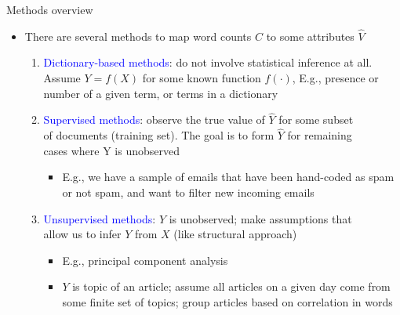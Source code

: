 \documentclass[english]{beamer}
\begin{document}
\begin{frame}{Methods overview}
\begin{itemize}
\setlength{\itemsep}{1em}
\item There are several methods to  map word counts $C$ to some attributes $\hat{V}$
\vspace{7pt}

\pause

\begin{enumerate}
\setlength{\itemsep}{1em}
\setlength{\itemindent}{-0.8em}
\item \textcolor{blue}{Dictionary-based methods}: do not involve statistical inference at all.\\
\hspace{-7pt}Assume $Y = f (X)$ for some known function $f(\cdot)$, E.g., presence or\\
\hspace{-7pt}number of a given term, or terms in a dictionary

\pause

\item\textcolor{blue}{Supervised methods}: observe the true value of $\hat{Y}$ for some subset\\
\hspace{-7pt}of documents (training set). The goal is to form $\hat{Y}$ for remaining\\
\hspace{-7pt}cases where Y is unobserved

\begin{itemize}
\setlength{\itemindent}{-1.5em}
\item E.g., we have a sample of emails that have been hand-coded as spam\\
\hspace{-13pt}or not spam, and want to filter new incoming emails
 \end{itemize}
 
 \pause

 \item\textcolor{blue}{Unsupervised methods}: $Y$ is unobserved; make assumptions that\\
\hspace{-7pt}allow us to infer $Y$ from $X$ (like structural approach)

\begin{itemize}
\setlength{\itemsep}{0.5em}
\setlength{\itemindent}{-1.5em}
\item E.g., principal component analysis
\item $Y$ is topic of an article; assume all articles on a given day come from\\
\hspace{-13pt}some finite set of topics; group articles based on correlation in words
\end{itemize}
 

\end{enumerate}
\end{itemize}
\end{frame}
\end{document}
